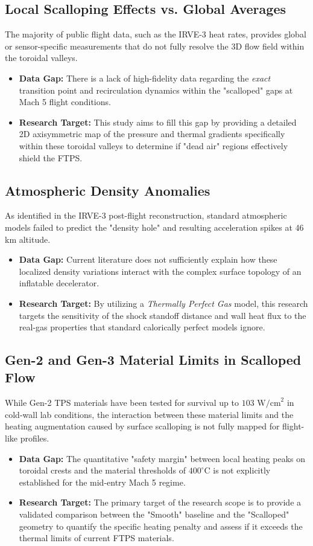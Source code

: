 \subsection{Local Scalloping Effects vs. Global Averages}
The majority of public flight data, such as the IRVE-3 heat rates, provides global or sensor-specific measurements that do not fully resolve the 3D flow field within the toroidal valleys. 
\begin{itemize}
    \item \textbf{Data Gap:} There is a lack of high-fidelity data regarding the \textit{exact} transition point and recirculation dynamics within the "scalloped" gaps at Mach 5 flight conditions.
    \item \textbf{Research Target:} This study aims to fill this gap by providing a detailed 2D axisymmetric map of the pressure and thermal gradients specifically within these toroidal valleys to determine if "dead air" regions effectively shield the FTPS.
\end{itemize}

\subsection{Atmospheric Density Anomalies}
As identified in the IRVE-3 post-flight reconstruction, standard atmospheric models failed to predict the "density hole" and resulting acceleration spikes at 46 km altitude.
\begin{itemize}
    \item \textbf{Data Gap:} Current literature does not sufficiently explain how these localized density variations interact with the complex surface topology of an inflatable decelerator.
    \item \textbf{Research Target:} By utilizing a \textit{Thermally Perfect Gas} model, this research targets the sensitivity of the shock standoff distance and wall heat flux to the real-gas properties that standard calorically perfect models ignore.
\end{itemize}

\subsection{Gen-2 and Gen-3 Material Limits in Scalloped Flow}
While Gen-2 TPS materials have been tested for survival up to $103 \text{ W/cm}^2$ in cold-wall lab conditions, the interaction between these material limits and the heating augmentation caused by surface scalloping is not fully mapped for flight-like profiles.
\begin{itemize}
    \item \textbf{Data Gap:} The quantitative "safety margin" between local heating peaks on toroidal crests and the material thresholds of $400^\circ\text{C}$ is not explicitly established for the mid-entry Mach 5 regime.
    \item \textbf{Research Target:} The primary target of the research scope is to provide a validated comparison between the "Smooth" baseline and the "Scalloped" geometry to quantify the specific heating penalty and assess if it exceeds the thermal limits of current FTPS materials.
\end{itemize}